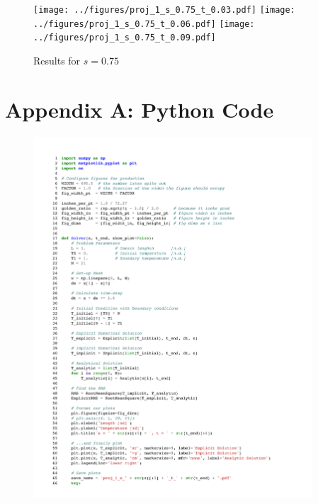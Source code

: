 \documentclass[twocolumn,10pt]{asme2ej}
\begin{document}
\begin{figure}[htb]
\begin{center}
\texttt{[image: ../figures/proj\_1\_s\_0.75\_t\_0.03.pdf]}
\texttt{[image: ../figures/proj\_1\_s\_0.75\_t\_0.06.pdf]}
\texttt{[image: ../figures/proj\_1\_s\_0.75\_t\_0.09.pdf]}
\caption{Results for $s = 0.75$}
\end{center}
\end{figure}

\clearpage
\onecolumn
\appendix       %
\section*{Appendix A: Python Code}

\begin{figure}[b]
\begin{center}
\includegraphics[page=1,width=0.93\textwidth]{../Karasinski - Case Study 1.pdf}
\end{center}
\end{figure}
\end{document}
